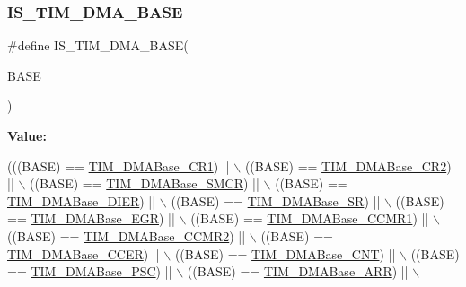 \subsubsection{\texorpdfstring{I\+S\+\_\+\+T\+I\+M\+\_\+\+D\+M\+A\+\_\+\+B\+A\+SE}{IS\_TIM\_DMA\_BASE}}
{\footnotesize\ttfamily \#define I\+S\+\_\+\+T\+I\+M\+\_\+\+D\+M\+A\+\_\+\+B\+A\+SE(\begin{DoxyParamCaption}\item[{}]{B\+A\+SE }\end{DoxyParamCaption})}

{\bfseries Value\+:}
\begin{DoxyCode}
(((BASE) == \hyperlink{group___t_i_m___d_m_a___base__address_ga73bca5b14da2d5026fa3877d0db53740}{TIM\_DMABase\_CR1}) || \(\backslash\)
                               ((BASE) == \hyperlink{group___t_i_m___d_m_a___base__address_ga50e894f0d2cecc1ff3a3578098c3246e}{TIM\_DMABase\_CR2}) || \(\backslash\)
                               ((BASE) == \hyperlink{group___t_i_m___d_m_a___base__address_ga748e24ac0675caa55869d6ba506448df}{TIM\_DMABase\_SMCR}) || \(\backslash\)
                               ((BASE) == \hyperlink{group___t_i_m___d_m_a___base__address_gaeddacbbc2adf9705feac250f077d8c93}{TIM\_DMABase\_DIER}) || \(\backslash\)
                               ((BASE) == \hyperlink{group___t_i_m___d_m_a___base__address_ga5cda07a11a76bbb24a7d5bb680814d31}{TIM\_DMABase\_SR}) || \(\backslash\)
                               ((BASE) == \hyperlink{group___t_i_m___d_m_a___base__address_gab5e6f6c3fea100896d13ce317a6ccd8e}{TIM\_DMABase\_EGR}) || \(\backslash\)
                               ((BASE) == \hyperlink{group___t_i_m___d_m_a___base__address_gaab384496cff3e54d8179fc0db727c7ee}{TIM\_DMABase\_CCMR1}) || \(\backslash\)
                               ((BASE) == \hyperlink{group___t_i_m___d_m_a___base__address_ga4989f74592ab359f30bd7c4a4a457571}{TIM\_DMABase\_CCMR2}) || \(\backslash\)
                               ((BASE) == \hyperlink{group___t_i_m___d_m_a___base__address_ga6935639db5738662520e8d0eb7116dd6}{TIM\_DMABase\_CCER}) || \(\backslash\)
                               ((BASE) == \hyperlink{group___t_i_m___d_m_a___base__address_gacab604257d144cf3a59b360cbc958ec9}{TIM\_DMABase\_CNT}) || \(\backslash\)
                               ((BASE) == \hyperlink{group___t_i_m___d_m_a___base__address_gab8dd06970f235fe9f6997e0975237388}{TIM\_DMABase\_PSC}) || \(\backslash\)
                               ((BASE) == \hyperlink{group___t_i_m___d_m_a___base__address_gaab8a66f70e59b5916b4bba344746d652}{TIM\_DMABase\_ARR}) || \(\backslash\)

\end{DoxyCode}
